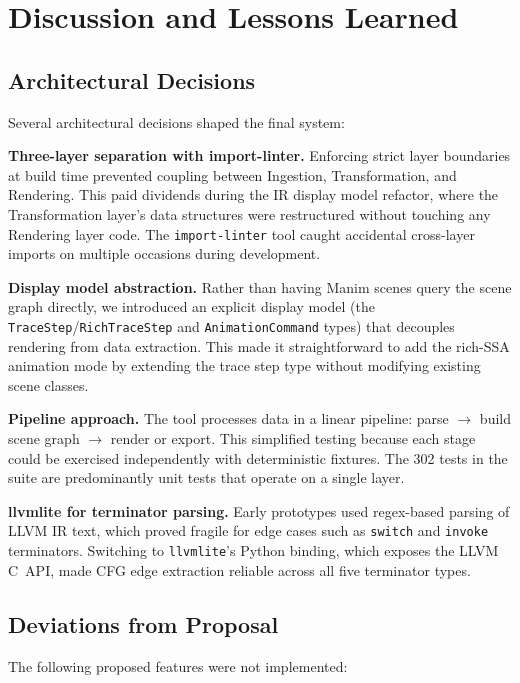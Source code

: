 \section{Discussion and Lessons Learned}

\subsection{Architectural Decisions}
Several architectural decisions shaped the final system:

\textbf{Three-layer separation with import-linter.} Enforcing strict layer boundaries at build time prevented coupling between Ingestion, Transformation, and Rendering. This paid dividends during the IR display model refactor, where the Transformation layer's data structures were restructured without touching any Rendering layer code. The \texttt{import-linter} tool caught accidental cross-layer imports on multiple occasions during development.

\textbf{Display model abstraction.} Rather than having Manim scenes query the scene graph directly, we introduced an explicit display model (the \texttt{TraceStep}/\texttt{RichTraceStep} and \texttt{AnimationCommand} types) that decouples rendering from data extraction. This made it straightforward to add the rich-SSA animation mode by extending the trace step type without modifying existing scene classes.

\textbf{Pipeline approach.} The tool processes data in a linear pipeline: parse $\rightarrow$ build scene graph $\rightarrow$ render or export. This simplified testing because each stage could be exercised independently with deterministic fixtures. The 302 tests in the suite are predominantly unit tests that operate on a single layer.

\textbf{llvmlite for terminator parsing.} Early prototypes used regex-based parsing of LLVM IR text, which proved fragile for edge cases such as \texttt{switch} and \texttt{invoke} terminators. Switching to \texttt{llvmlite}'s Python binding, which exposes the LLVM C~API, made CFG edge extraction reliable across all five terminator types.

\subsection{Deviations from Proposal}
The following proposed features were not implemented:

